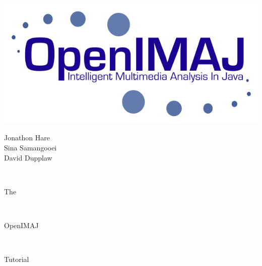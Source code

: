 \documentclass[10pt,a4paper,twoside,extrafontsizes]{memoir}
\newlength\titlepage
\newlength\titlepagefull
\begin{document}
	
\pagestyle{empty}

\begin{minipage}{0.5\titlepage}
\includegraphics{OpenIMAJ.png}
\end{minipage}
\hspace{0.001pt}
\begin{minipage}{0.5\titlepage}
\Huge
\flushright
Jonathon Hare\\
Sina Samangooei\\
David Dupplaw
\end{minipage}
\\[10cm]
\begin{minipage}{\titlepage}
\fontsize{60}{100}\selectfont\flushright The
\end{minipage}
\\[1cm]
\colorbox{nicered}{\parbox{\titlepagefull}{
	\parbox{\titlepage}{
		\color{white}\fontsize{80}{120}\selectfont\flushright OpenIMAJ\\[0.4cm]}
	}
}
\\[0.8cm]
\begin{minipage}{\titlepage}
\fontsize{60}{100}\selectfont\flushright Tutorial
\end{minipage}
\cleardoublepage


\tableofcontents*









\end{document}
